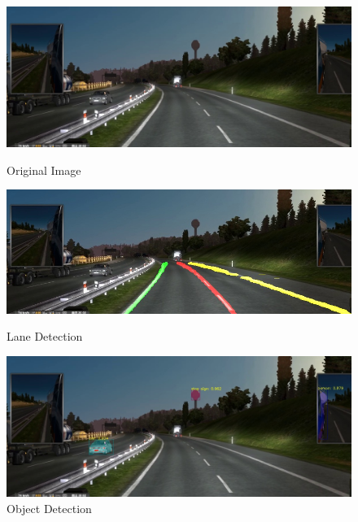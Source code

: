 \documentclass[runningheads]{llncs}
\begin{document}
\begin{figure}[!htb]
	\includegraphics[width=\linewidth]{result/w000128.jpg}
	\caption{Original Image}\label{fig:Original_Image}
	\endminipage\hfill
	\includegraphics[width=\linewidth]{result/w000128-lane.jpg}
	\caption{Lane Detection}\label{fig:Lane_Line_Result}
	\endminipage\hfill
	\includegraphics[width=\linewidth]{result/w000128-obj.jpg}
	\caption{Object Detection}\label{fig:Object_result}
	\endminipage
\end{figure}
\end{document}

